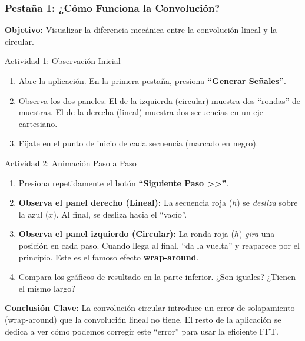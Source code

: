 \documentclass[10pt]{beamer}
\begin{document}
\begin{frame}[allowframebreaks]
  \frametitle{Pestaña 1: ¿Cómo Funciona la Convolución?}
  
  \textbf{Objetivo:} Visualizar la diferencia mecánica entre la convolución lineal y la circular.
  
  \begin{block}{Actividad 1: Observación Inicial}
  \begin{enumerate}
    \item Abre la aplicación. En la primera pestaña, presiona \textbf{“Generar Señales”}.
    \item Observa los dos paneles. El de la izquierda (circular) muestra dos ``rondas'' de muestras. El de la derecha (lineal) muestra dos secuencias en un eje cartesiano.
    \item Fíjate en el punto de inicio de cada secuencia (marcado en negro).
  \end{enumerate}
  \end{block}
  
  \pause
  
  \begin{block}{Actividad 2: Animación Paso a Paso}
    \begin{enumerate}
      \item Presiona repetidamente el botón \textbf{“Siguiente Paso >>”}.
      \item \textbf{Observa el panel derecho (Lineal):} La secuencia roja ($h$) se \textit{desliza} sobre la azul ($x$). Al final, se desliza hacia el ``vacío''.
      \item \textbf{Observa el panel izquierdo (Circular):} La ronda roja ($h$) \textit{gira} una posición en cada paso. Cuando llega al final, ``da la vuelta'' y reaparece por el principio. Este es el famoso efecto \textbf{wrap-around}.
      \item Compara los gráficos de resultado en la parte inferior. ¿Son iguales? ¿Tienen el mismo largo?
    \end{enumerate}
  \end{block}
  
  \pause
  
  \begin{tcolorbox}[colback=green!5!white, colframe=green!50!black]
    \textbf{Conclusión Clave:} La convolución circular introduce un error de solapamiento (wrap-around) que la convolución lineal no tiene. El resto de la aplicación se dedica a ver cómo podemos corregir este ``error'' para usar la eficiente FFT.
  \end{tcolorbox}
  
\end{frame}
\end{document}
